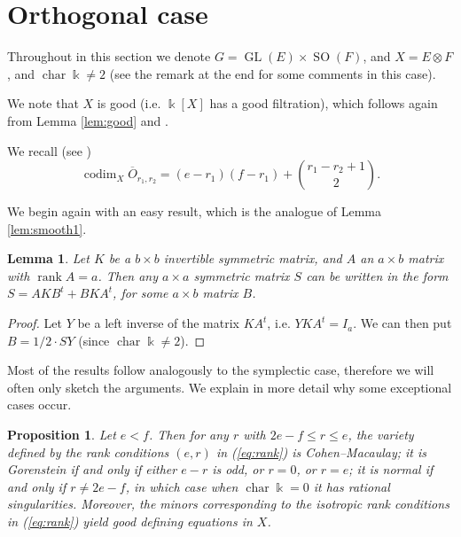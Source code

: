 \documentclass[11pt]{amsart}
\numberwithin{equation}{section}
\newtheorem{proposition}[equation]{Proposition}
\newtheorem{lemma}[equation]{Lemma}
\theoremstyle{definition}
\DeclareMathOperator{\codim}{codim}
\DeclareMathOperator{\rank}{rank}
\DeclareMathOperator{\GL}{GL}
\DeclareMathOperator{\cha}{char}
\newcommand{\op}{\operatorname}
\newcommand{\oo}{\otimes}
\newcommand{\ol}{\overline}
\newcommand{\kk}{\Bbbk}
\begin{document}
\section{Orthogonal case}

Throughout in this section we denote $G=\GL(E)\times \op{SO}(F)$, and $X=E\oo F$, and  $\cha \kk \neq 2$ (see the remark at the end for some comments in this case).

We note that $X$ is good (i.e. $\kk[X]$ has a good filtration), which follows again from Lemma \ref{lem:good} and \cite[Section 4.9]{andjan}.

We recall (see \cite[Corollary 2.4]{lovett05})
\begin{equation}\label{eq:codim2}
\codim_X \ol{O}_{r_1,r_2} =  (e-r_1)(f-r_1)+ \binom{r_1-r_2+1}{2}.
\end{equation}

We begin again with an easy result, which is the analogue of Lemma \ref{lem:smooth1}.

\begin{lemma}\label{lem:smooth2}
Let $K$ be a $b\times b$ invertible symmetric matrix, and $A$ an $a\times b$ matrix with $\rank A=a$. Then any $a\times a$ symmetric matrix $S$ can be written in the form $S=A K B^t + B K A^t$, for some $a \times b$ matrix $B$.
\end{lemma}

\begin{proof}
Let $Y$ be a left inverse of the matrix $K A^t$, i.e. $Y K A^t= I_a$. We can then put $B=1/2 \cdot SY$ (since $\cha \kk \neq 2$).
\end{proof}

Most of the results follow analogously to the symplectic case, therefore we will often only sketch the arguments. We explain in more detail why some exceptional cases occur.

\begin{proposition}\label{prop:orthinv}
Let $e < f$. Then for any $r$ with $2e-f\leq r\leq e$, the variety defined by the rank conditions $(e, r)$ in (\ref{eq:rank}) is Cohen--Macaulay; it is Gorenstein if and only if either $e-r$ is odd, or $r=0$, or $r=e$; it is normal if and only if $r\neq 2e-f$, in which case when $\cha \kk =0$ it has rational singularities. Moreover, the minors corresponding to the isotropic rank conditions in (\ref{eq:rank}) yield good defining equations in $X$.
\end{proposition}
\end{document}
